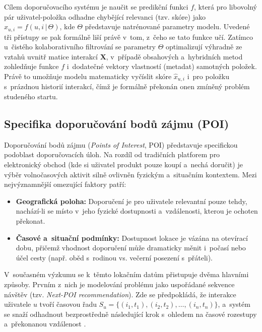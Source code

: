 Cílem doporučovacího systému je naučit se predikční funkci $f$, která pro libovolný pár uživatel-položka odhadne chybějící relevanci (tzv. skóre) jako $\hat{x}_{u,i} = f(u, i \,|\, \Theta)$, kde $\Theta$ představuje natrénované parametry modelu. Uvedené tři přístupy se pak formálně liší právě v~tom, z~čeho se tato funkce učí. Zatímco u~čistého kolaborativního filtrování se parametry $\Theta$ optimalizují výhradně ze vztahů uvnitř matice interakcí $\mathbf{X}$, v~případě obsahových a~hybridních metod zohledňuje funkce $f$ i~dodatečné vektory vlastností (metadat) samotných položek. Právě to umožňuje modelu matematicky vyčíslit skóre $\hat{x}_{u,i}$ i~pro položku s~prázdnou historií interakcí, čímž je formálně překonán onen zmíněný problém studeného startu.

\subsection{Specifika doporučování bodů zájmu (POI)}
\label{subsec:specifika_poi}

Doporučování bodů zájmu (\textit{Points of Interest}, POI) představuje specifickou podoblast doporučovacích úloh. Na rozdíl od tradičních platforem pro elektronický obchod (kde si uživatel produkt pouze koupí a~nechá doručit) je výběr volnočasových aktivit silně ovlivněn fyzickým a~situačním kontextem. Mezi nejvýznamnější omezující faktory patří:

\begin{itemize}
    \item \textbf{Geografická poloha:} Doporučení je pro uživatele relevantní pouze tehdy, nachází-li se místo v~jeho fyzické dostupnosti a~vzdálenosti, kterou je ochoten překonat.
    \item \textbf{Časové a~situační podmínky:} Dostupnost lokace je vázána na otevírací dobu, přičemž vhodnost doporučení může dramaticky měnit i~počasí nebo účel cesty (např. oběd s~rodinou vs. večerní posezení s~přáteli).
\end{itemize}

V~současném výzkumu se k~těmto lokačním datům přistupuje dvěma hlavními způsoby. Prvním z~nich je modelování problému jako uspořádané sekvence návštěv (tzv. \textit{Next-POI recommendation}). Zde se předpokládá, že interakce uživatele $u$ tvoří časovou řadu $S_u = \{(i_1, t_1), (i_2, t_2), \dots, (i_n, t_n)\}$, a~systém se snaží odhadnout bezprostředně následující krok s~ohledem na časové rozestupy a~překonanou vzdálenost \cite{Zeng2025}. 


